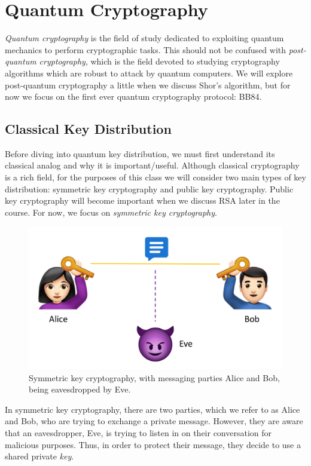 \documentclass[11pt]{article} %
\begin{document}
\newpage
\section{Quantum Cryptography}

\textit{Quantum cryptography} is the field of study dedicated to exploiting quantum mechanics to perform cryptographic tasks. This should not be confused with \textit{post-quantum cryptography}, which is the field devoted to studying cryptography algorithms which are robust to attack by quantum computers. We will explore post-quantum cryptography a little when we discuss Shor's algorithm, but for now we focus on the first ever quantum cryptography protocol: BB84.

\subsection{Classical Key Distribution}
Before diving into quantum key distribution, we must first understand its classical analog and why it is important/useful. Although classical cryptography is a rich field, for the purposes of this class we will consider two main types of key distribution: symmetric key cryptography and public key cryptography. Public key cryptography will become important when we discuss RSA later in the course. For now, we focus on \textit{symmetric key cryptography}.

\begin{figure}[h!]
    \centering
    \includegraphics[width=.7\textwidth]{Lecture4Figs/SymmetricKeyDist.pdf}
    \caption{Symmetric key cryptography, with messaging parties Alice and Bob, being eavesdropped by Eve.}
    \label{fig:QKD}
\end{figure}

In symmetric key cryptography, there are two parties, which we refer to as Alice and Bob, who are trying to exchange a private message. However, they are aware that an eavesdropper, Eve, is trying to listen in on their conversation for malicious purposes. Thus, in order to protect their message, they decide to use a shared private \textit{key}. 
\end{document}
